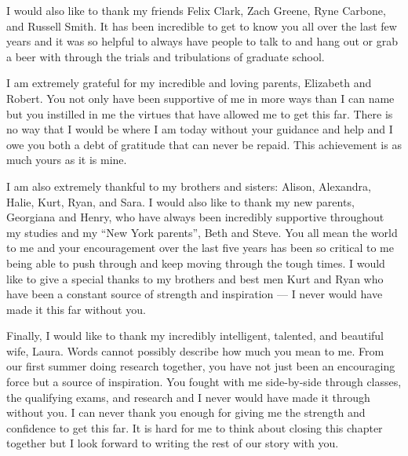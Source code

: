 I would also like to thank my friends Felix Clark, Zach Greene, Ryne Carbone, and Russell Smith.  It has been incredible to get to know you all over the last few years and it was so helpful to always have people to talk to and hang out or grab a beer with through the trials and tribulations of graduate school.  


I am extremely grateful for my incredible and loving parents, Elizabeth and Robert.  You not only have been supportive of me in more ways than I can name but you instilled in me the virtues that have allowed me to get this far.  There is no way that I would be where I am today without your guidance and help and I owe you both a debt of gratitude that can never be repaid.  This achievement is as much yours as it is mine.



I am also extremely thankful to my brothers and sisters: Alison, Alexandra, Halie, Kurt, Ryan, and Sara.  I would also like to thank my new parents, Georgiana and Henry, who have always been incredibly supportive throughout my studies and my ``New York parents'', Beth and Steve.  You all mean the world to me and your encouragement over the last five years has been so critical to me being able to push through and keep moving through the tough times.  I would like to give a special thanks to my brothers and best men Kurt and Ryan who have been a constant source of strength and inspiration --- I never would have made it this far without you.  


Finally, I would like to thank my incredibly intelligent, talented, and beautiful wife, Laura.  Words cannot possibly describe how much you mean to me.  From our first summer doing research together, you have not just been an encouraging force but a source of inspiration.  You fought with me side-by-side through classes, the qualifying exams, and research and I never would have made it through without you.  I can never thank you enough for giving me the strength and confidence to get this far.  It is hard for me to think about closing this chapter together but I look forward to writing the rest of our story with you.  %





